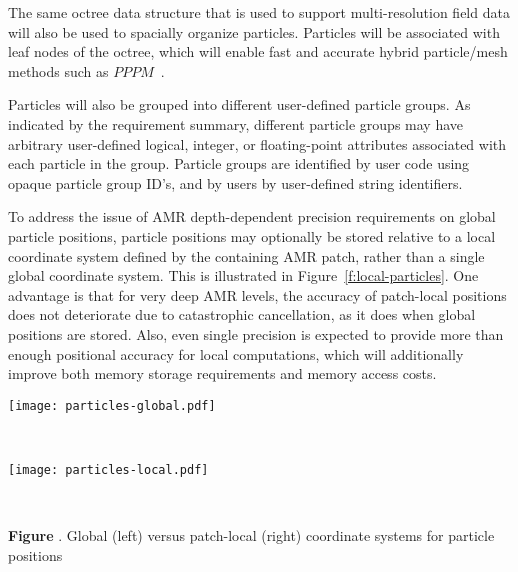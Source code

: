 \documentclass[11pt,letterpaper]{article}
\newcounter{figctr}
\newcommand{\FIGURE}[3]{
\noindent
\parbox{\textwidth}{
\begin{center}
#3
\end{center}%
\ \nolinebreak%
\refstepcounter{figctr}%
\begin{center}%
\begin{minipage}{7.0in}
\textbf{Figure \thefigctr}. #1
\end{minipage}
\end{center}
\label{#2}
}}
\begin{document}
The same octree data structure that is used to support
multi-resolution field data will also be used to spacially organize
particles.  Particles will be associated with leaf nodes of the
octree, which will enable fast and accurate hybrid particle/mesh
methods such as $PPPM$~\cite{HoEa88}.

Particles will also be grouped into different user-defined particle
groups.  As indicated by the requirement summary, different particle
groups may have arbitrary user-defined logical, integer, or
floating-point attributes associated with each particle in the group.
Particle groups are identified by user code using opaque particle
group ID's, and by users by user-defined string identifiers.

To address the issue of AMR depth-dependent precision requirements on
global particle positions, particle positions may optionally be stored
relative to a local coordinate system defined by the containing AMR
patch, rather than a single global coordinate system.  This is
illustrated in Figure~\ref{f:local-particles}.  One advantage is that
for very deep AMR levels, the accuracy of patch-local positions does
not deteriorate due to catastrophic cancellation, as it does when
global positions are stored.  Also, even single precision is expected
to provide more than enough positional accuracy for local
computations, which will additionally improve both memory storage
requirements and memory access costs.


\FIGURE{Global (left) versus patch-local (right) coordinate systems for
  particle positions}{f:local-particles}{
\begin{minipage}{6.8in}
\begin{minipage}{3.3in}
\texttt{[image: particles-global.pdf]}
\end{minipage} \ 
\begin{minipage}{3.3in}
\texttt{[image: particles-local.pdf]}
\end{minipage}
\end{minipage}}
\end{document}
